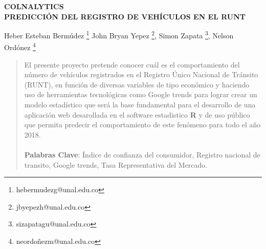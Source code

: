 \documentclass[11pt,twoside]{article}
\date{}
\begin{document}
{
	\fancyhead[L]{}
	\fancyfoot[LO,RE]{}
	\fancyfoot[LE,RO]{ \vspace{10pt}\thepage}
	\renewcommand{\headrulewidth}{0pt}
	\renewcommand{\footrulewidth}{0pt}
}

\thispagestyle{firststyle}
\begin{center}
\Large{{\bf COLNALYTICS\\
\vspace{20pt}   PREDICCIÓN DEL REGISTRO DE VEHÍCULOS EN EL RUNT\\ 
\vspace{10pt}}}
\end{center}

{\normalsize{
Heber Esteban Bermúdez			\footnote{\footnotesize{ hebermudezg@unal.edu.co}}
John Bryan Yepez				\footnote{\footnotesize{ jbyepezh@unal.edu.co}},
Simon Zapata 					\footnote{\footnotesize{sizapatagu@unal.edu.co}},
Nelson Ordónez 			\footnote{\footnotesize{neordoñezm@unal.edu.co}}
}}





\begin{abstract}
\noindent
El presente proyecto pretende conocer cuál es el comportamiento del número de vehículos registrados en el Registro Único Nacional de Tránsito (RUNT), en función de diversas variables de tipo económico y haciendo uso de herramientas tecnológicas como Google trends para lograr crear un modelo estadístico que será la base fundamental para el desarrollo de una aplicación web desarollada en el software estadistico \textbf{R} y de uso público que permita predecir el comportamiento de este fenómeno para todo el año 2018.
\\
\\
\textbf{Palabras Clave}: Índice de confianza del consumidor, Registro nacional de transito, Google
trends, Tasa Representativa del Mercado. 
\end{abstract}



\end{document}
